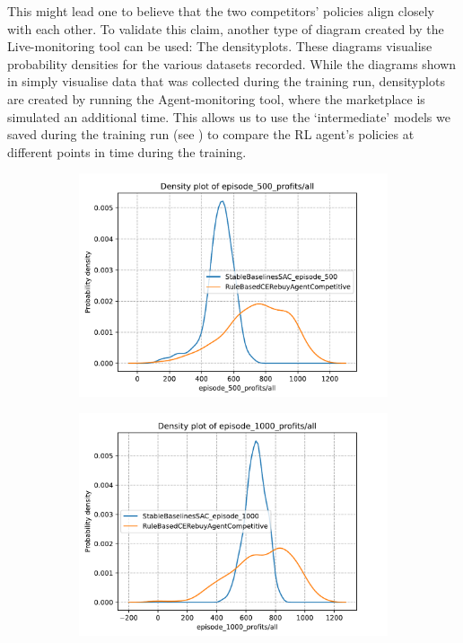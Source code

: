 This might lead one to believe that the two competitors' policies align closely with each other. To validate this claim, another type of diagram created by the Live-monitoring tool can be used: The densityplots. These diagrams visualise probability densities for the various datasets recorded. While the diagrams shown in  simply visualise data that was collected during the training run, densityplots are created by running the Agent-monitoring tool, where the marketplace is simulated an additional time. This allows us to use the `intermediate' models we saved during the training run (see ) to compare the RL agent's policies at different points in time during the training.

\begin{figure}[t]
	\centering
	\begin{subfigure}{0.49\textwidth}
		\centering
		\includegraphics[width = \textwidth]{images/experiments/SACDuopoly/SACDuopolyProfitsDensity1.pdf}\\
		\label{fig:SACDuopolyProfitsDensity1}
	\end{subfigure}
	\begin{subfigure}{0.49\textwidth}
		\centering
		\includegraphics[width = \textwidth]{images/experiments/SACDuopoly/SACDuopolyProfitsDensity2.pdf}\\

\end{subfigure}
\end{figure}
